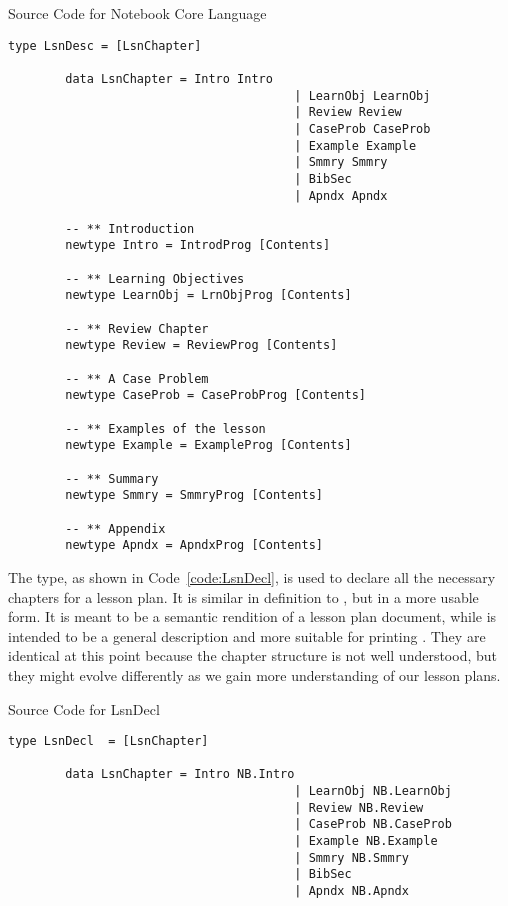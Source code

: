 \begin{listing}[h!]
	\caption{Source Code for Notebook Core Language}
	\label{code:core}
	\begin{lstlisting}[language=haskell1]		
		type LsnDesc = [LsnChapter]

		data LsnChapter = Intro Intro
										| LearnObj LearnObj
										| Review Review
										| CaseProb CaseProb
										| Example Example
										| Smmry Smmry
										| BibSec
										| Apndx Apndx
		
		-- ** Introduction
		newtype Intro = IntrodProg [Contents]
		
		-- ** Learning Objectives
		newtype LearnObj = LrnObjProg [Contents]
		
		-- ** Review Chapter
		newtype Review = ReviewProg [Contents]
		
		-- ** A Case Problem
		newtype CaseProb = CaseProbProg [Contents]
		
		-- ** Examples of the lesson
		newtype Example = ExampleProg [Contents]
		
		-- ** Summary
		newtype Smmry = SmmryProg [Contents]
		
		-- ** Appendix
		newtype Apndx = ApndxProg [Contents]
	\end{lstlisting}
\end{listing}

The  type, as shown in Code~\ref{code:LsnDecl}, is used to 
declare all the necessary chapters for a lesson plan. It is similar in 
definition to , but in a more usable form. It is meant to be a 
semantic rendition of a lesson plan document, while  is 
intended to be a general description and more suitable for printing 
\cite{lsnDeclandlsnDesc}. They are identical at this point because the chapter 
structure is not well understood, but they might evolve differently as we gain 
more understanding of our lesson plans.

\begin{listing}[h]
	\caption{Source Code for LsnDecl}
	\label{code:LsnDecl}
	\begin{lstlisting}[language=haskell1]
		type LsnDecl  = [LsnChapter]
		
		data LsnChapter = Intro NB.Intro
										| LearnObj NB.LearnObj
										| Review NB.Review
										| CaseProb NB.CaseProb
										| Example NB.Example
										| Smmry NB.Smmry
										| BibSec
										| Apndx NB.Apndx
	\end{lstlisting}
\end{listing}

